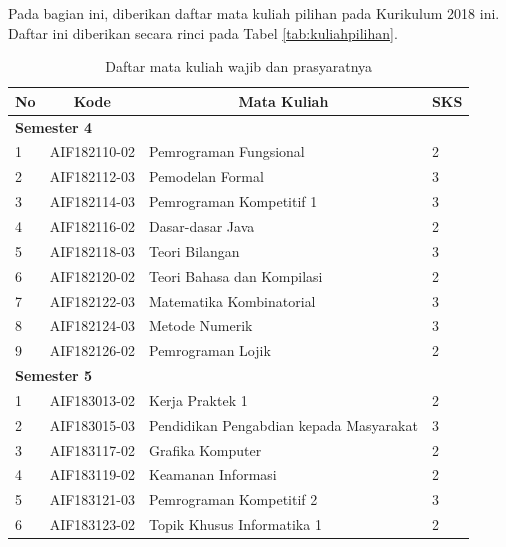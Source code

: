 Pada bagian ini, diberikan daftar mata kuliah pilihan pada Kurikulum 2018 ini. Daftar ini diberikan secara rinci pada Tabel \ref{tab:kuliahpilihan}.

\begin{table}[H]
	\centering
		\caption{Daftar mata kuliah wajib dan prasyaratnya}
		\begin{tabular}{|p{0.5cm}|p{2.85cm}|p{4.95cm}|p{2.7cm}|}
			\hline
			\multicolumn{1}{|c|}{\textbf{No}} & \multicolumn{1}{c|}{\textbf{Kode}} & \multicolumn{1}{c|}{\textbf{Mata Kuliah}} & \multicolumn{1}{c|}{\textbf{SKS}} \\ \hline
\multicolumn{4}{|l|}{\textbf{Semester 4}}                                \\ \hline
1   & AIF182110-02    & Pemrograman Fungsional                     & 2   \\ \hline
2   & AIF182112-03    & Pemodelan Formal                           & 3   \\ \hline
3   & AIF182114-03    & Pemrograman Kompetitif 1                   & 3   \\ \hline
4   & AIF182116-02    & Dasar-dasar Java                           & 2   \\ \hline
5   & AIF182118-03    & Teori Bilangan                             & 3   \\ \hline
6   & AIF182120-02    & Teori Bahasa dan Kompilasi                 & 2   \\ \hline
7   & AIF182122-03    & Matematika Kombinatorial                   & 3   \\ \hline
8   & AIF182124-03    & Metode Numerik                             & 3   \\ \hline
9   & AIF182126-02    & Pemrograman Lojik                          & 2   \\ \hline
\multicolumn{4}{|l|}{\textbf{Semester 5}}                                \\ \hline
1   & AIF183013-02    & Kerja Praktek 1                            & 2   \\ \hline
2   & AIF183015-03    & Pendidikan Pengabdian kepada Masyarakat    & 3   \\ \hline
3   & AIF183117-02    & Grafika Komputer                           & 2   \\ \hline
4   & AIF183119-02    & Keamanan Informasi                         & 2   \\ \hline
5   & AIF183121-03    & Pemrograman Kompetitif 2                   & 3   \\ \hline
6   & AIF183123-02    & Topik Khusus Informatika 1                 & 2   \\ \hline

\end{tabular}
\end{table}
